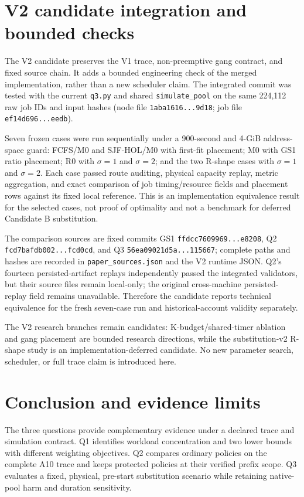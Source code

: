 \section{V2 candidate integration and bounded checks}
The V2 candidate preserves the V1 trace, non-preemptive gang contract, and fixed source chain. It adds a bounded engineering check of the merged implementation, rather than a new scheduler claim. The integrated commit was tested with the current \texttt{q3.py} and shared \texttt{simulate\_pool} on the same 224,112 raw job IDs and input hashes (node file \texttt{1aba1616...9d18}; job file \texttt{ef14d696...eedb}).

Seven frozen cases were run sequentially under a 900-second and 4-GiB address-space guard: FCFS/M0 and SJF-HOL/M0 with first-fit placement; M0 with GS1 ratio placement; R0 with $\sigma=1$ and $\sigma=2$; and the two R-shape cases with $\sigma=1$ and $\sigma=2$. Each case passed route auditing, physical capacity replay, metric aggregation, and exact comparison of job timing/resource fields and placement rows against its fixed local reference. This is an implementation equivalence result for the selected cases, not proof of optimality and not a benchmark for deferred Candidate B substitution.

The comparison sources are fixed commits GS1 \texttt{ffdcc7609969...e8208}, Q2 \texttt{fcd7bafdb002...fcd0cd}, and Q3 \texttt{56ea09021d5a...115667}; complete paths and hashes are recorded in \texttt{paper\_sources.json} and the V2 runtime JSON. Q2's fourteen persisted-artifact replays independently passed the integrated validators, but their source files remain local-only; the original cross-machine persisted-replay field remains unavailable. Therefore the candidate reports technical equivalence for the fresh seven-case run and historical-account validity separately.

The V2 research branches remain candidates: K-budget/shared-timer ablation and gang placement are bounded research directions, while the substitution-v2 R-shape study is an implementation-deferred candidate. No new parameter search, scheduler, or full trace claim is introduced here.

\section{Conclusion and evidence limits}
The three questions provide complementary evidence under a declared trace and simulation contract. Q1 identifies workload concentration and two lower bounds with different weighting objectives. Q2 compares ordinary policies on the complete A10 trace and keeps protected policies at their verified prefix scope. Q3 evaluates a fixed, physical, pre-start substitution scenario while retaining native-pool harm and duration sensitivity.

